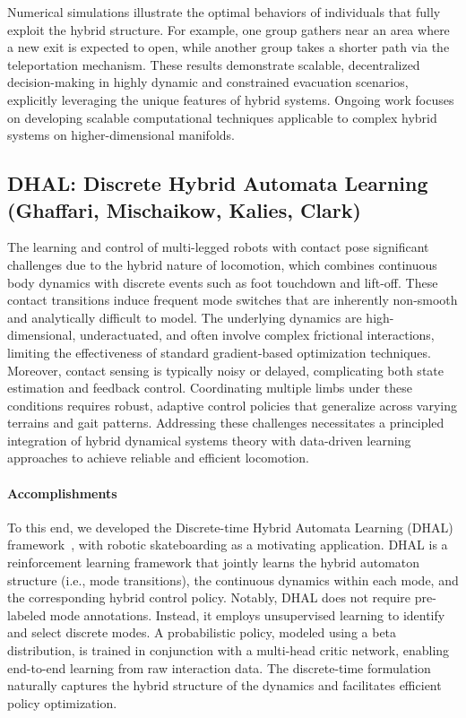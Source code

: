 \documentclass[letterpaper,11pt]{article}
\begin{document}
Numerical simulations illustrate the optimal behaviors of individuals that fully exploit the hybrid structure.
For example, one group gathers near an area where a new exit is expected to open, while another group takes a shorter path via the teleportation mechanism.
These results demonstrate scalable, decentralized decision-making in highly dynamic and constrained evacuation scenarios, explicitly leveraging the unique features of hybrid systems.
Ongoing work focuses on developing scalable computational techniques applicable to complex hybrid systems on higher-dimensional manifolds.

\subsection{DHAL: Discrete Hybrid Automata Learning (Ghaffari, Mischaikow, Kalies, Clark)}\label{sec:DHAL}

The learning and control of multi-legged robots with contact pose significant challenges due to the hybrid nature of locomotion, which combines continuous body dynamics with discrete events such as foot touchdown and lift-off.
These contact transitions induce frequent mode switches that are inherently non-smooth and analytically difficult to model.
The underlying dynamics are high-dimensional, underactuated, and often involve complex frictional interactions, limiting the effectiveness of standard gradient-based optimization techniques.
Moreover, contact sensing is typically noisy or delayed, complicating both state estimation and feedback control.
Coordinating multiple limbs under these conditions requires robust, adaptive control policies that generalize across varying terrains and gait patterns.
Addressing these challenges necessitates a principled integration of hybrid dynamical systems theory with data-driven learning approaches to achieve reliable and efficient locomotion.

\paragraph{Accomplishments}

To this end, we developed the Discrete-time Hybrid Automata Learning (DHAL) framework~\cite{liu2025discrete}, with robotic skateboarding as a motivating application.
DHAL is a reinforcement learning framework that jointly learns the hybrid automaton structure (i.e., mode transitions), the continuous dynamics within each mode, and the corresponding hybrid control policy.
Notably, DHAL does not require pre-labeled mode annotations.
Instead, it employs unsupervised learning to identify and select discrete modes.
A probabilistic policy, modeled using a beta distribution, is trained in conjunction with a multi-head critic network, enabling end-to-end learning from raw interaction data.
The discrete-time formulation naturally captures the hybrid structure of the dynamics and facilitates efficient policy optimization.
\end{document}
